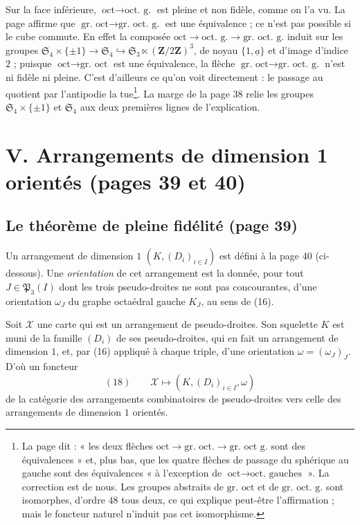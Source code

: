 \documentclass[11pt,a4paper]{article}
\begin{document}
Sur la face inférieure, $\text{oct} \to \text{oct.\ g.}$ est pleine et non
fidèle, comme on l'a vu. La page affirme que $\text{gr.\ oct} \to
\text{gr.\ oct.\ g.}$ est une équivalence ; ce n'est pas possible si le cube commute.
En effet la composée $\text{oct} \to \text{oct.\ g.} \to \text{gr.\ oct.\ g.}$
induit sur les groupes $\mathfrak{S}_4 \times \{\pm 1\} \to \mathfrak{S}_4
\hookrightarrow \mathfrak{S}_3 \ltimes (\mathbf{Z}/2\mathbf{Z})^3$, de noyau
$\{1, \underline{a}\}$ et d'image d'indice $2$ ; puisque $\text{oct} \to
\text{gr.\ oct}$ est une équivalence, la flèche $\text{gr.\ oct} \to
\text{gr.\ oct.\ g.}$ n'est ni fidèle ni pleine. C'est d'ailleurs ce qu'on voit
directement : le passage au quotient par l'antipodie la tue\footnote{La
page dit : « les deux flèches $\text{oct} \to \text{gr.\ oct.} \to
\text{gr.\ oct g.}$ sont des équivalences » et, plus bas, que les quatre
flèches de passage du sphérique au gauche sont des équivalences « à
l'exception de $\text{oct} \to \text{oct.\ gauches}$ ». La correction est de
nous. Les groupes abstraits de $\text{gr.\ oct}$ et de $\text{gr.\ oct.\ g.}$
sont isomorphes, d'ordre $48$ tous deux, ce qui explique peut-être
l'affirmation ; mais le foncteur naturel n'induit pas cet isomorphisme.}. La
marge de la page 38 relie les groupes $\mathfrak{S}_4 \times \{\pm 1\}$ et
$\mathfrak{S}_4$ aux deux premières lignes de l'explication.

\section*{V. Arrangements de dimension 1 orientés (pages 39 et 40)}

\subsection*{Le théorème de pleine fidélité (page 39)}

Un arrangement de dimension $1$ $(K, (D_i)_{i \in I})$ est défini à la page
40 (ci-dessous). Une \emph{orientation} de cet arrangement est la donnée, pour tout $J
\in \mathfrak{P}_3(I)$ dont les trois pseudo-droites ne sont pas concourantes,
d'une orientation $\omega_J$ du graphe octaédral gauche $K_J$, au sens de
(16).

Soit $\mathcal{X}$ une carte qui est un arrangement de pseudo-droites. Son
squelette $K$ est muni de la famille $(D_i)$ de ses pseudo-droites, qui en fait
un arrangement de dimension $1$, et, par (16) appliqué à chaque triple, d'une
orientation $\omega = (\omega_J)_J$. D'où un foncteur
\[
(18) \qquad \mathcal{X} \longmapsto (K, (D_i)_{i \in I}, \omega)
\]
de la catégorie des arrangements combinatoires de pseudo-droites vers celle
des arrangements de dimension $1$ orientés.
\end{document}
